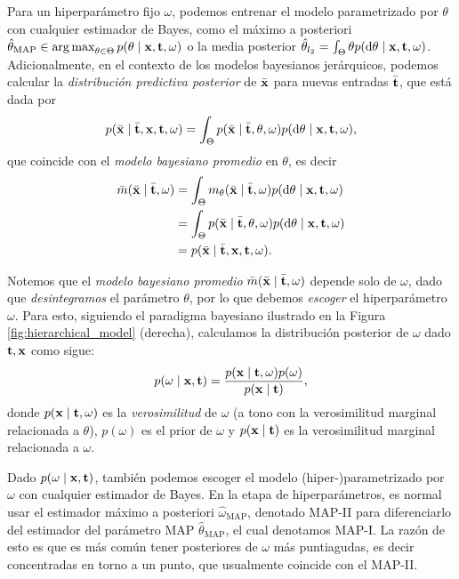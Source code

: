 Para un hiperparámetro fijo \(\omega\), podemos entrenar el modelo parametrizado por \(\theta\) con cualquier estimador de Bayes, como el máximo a posteriori \(\hat{\theta}_{\mathrm{MAP}} \in \operatorname*{\arg\max}_{\theta \in \Theta} p(\theta \mid \mathbf{x}, \mathbf{t}, \omega)\) o la media posterior \(\hat{\theta}_{l_2} = \int_{\Theta} \theta p(\dd{\theta \mid \mathbf{x}, \mathbf{t}, \omega})\). Adicionalmente, en el contexto de los modelos bayesianos jerárquicos, podemos calcular la \emph{distribución predictiva posterior} de \(\bar{\mathbf{x}}\) para nuevas entradas \(\bar{\mathbf{t}}\), que está dada por
\begin{equation*}
	p(\bar{\mathbf{x}} \mid \bar{\mathbf{t}}, \mathbf{x}, \mathbf{t}, \omega) = \int_{\Theta} p(\bar{\mathbf{x}} \mid \bar{\mathbf{t}}, \theta, \omega) p(\dd{\theta \mid \mathbf{x}, \mathbf{t}, \omega}),
\end{equation*}
que coincide con el \emph{modelo bayesiano promedio} en \(\theta\), es decir
\begin{align}
	\bar m(\bar{\mathbf{x}} \mid \bar{\mathbf{t}}, \omega)	&= \int_{\Theta} m_{\theta}(\bar{\mathbf{x}} \mid \bar{\mathbf{t}}, \omega) p(\dd{\theta \mid \mathbf{x}, \mathbf{t}, \omega}) \nonumber \\
										&= \int_{\Theta} p(\bar{\mathbf{x}} \mid \bar{\mathbf{t}}, \theta, \omega) p(\dd{\theta \mid \mathbf{x}, \mathbf{t}, \omega}) \nonumber\\
										&= p(\bar{\mathbf{x}} \mid \bar{\mathbf{t}}, \mathbf{x}, \mathbf{t}, \omega).
\end{align}

Notemos que el \emph{modelo bayesiano promedio} \(\bar{m}(\bar{\mathbf{x}} \mid \bar{\mathbf{t}}, \omega)\) depende solo de \(\omega\), dado que \emph{desintegramos} el parámetro \(\theta\), por lo que debemos \emph{escoger} el hiperparámetro \(\omega\). Para esto, siguiendo el paradigma bayesiano ilustrado en la Figura \ref{fig:hierarchical_model} (derecha), calculamos la distribución posterior de \(\omega\) dado \(\mathbf{t}, \mathbf{x}\) como sigue:
\begin{equation*}
	p(\omega \mid \mathbf{x}, \mathbf{t}) = \frac{p(\mathbf{x} \mid \mathbf{t}, \omega) p(\omega)}{p(\mathbf{x} \mid \mathbf{t})},
\end{equation*}
donde \(p(\mathbf{x} \mid \mathbf{t}, \omega)\) es la \emph{verosimilitud} de \(\omega\) (a tono con la verosimilitud marginal relacionada a \(\theta\)), \(p(\omega)\) es el prior de \(\omega\) y \(p(\mathbf{x} \mid \mathbf{t})\) es la verosimilitud marginal relacionada a \(\omega\).

Dado \(p(\omega \mid \mathbf{x}, \mathbf{t})\), también podemos escoger el modelo (hiper-)parametrizado por \(\omega\) con cualquier estimador de Bayes. En la etapa de hiperparámetros, es normal usar el estimador máximo a posteriori \(\hat{\omega}_{\mathrm{MAP}}\), denotado MAP-II para diferenciarlo del estimador del parámetro MAP \(\hat{\theta}_{\mathrm{MAP}}\), el cual denotamos MAP-I. La razón de esto es que es más común tener posteriores de \(\omega\) más puntiagudas, es decir concentradas en torno a un punto, que usualmente coincide con el MAP-II.

